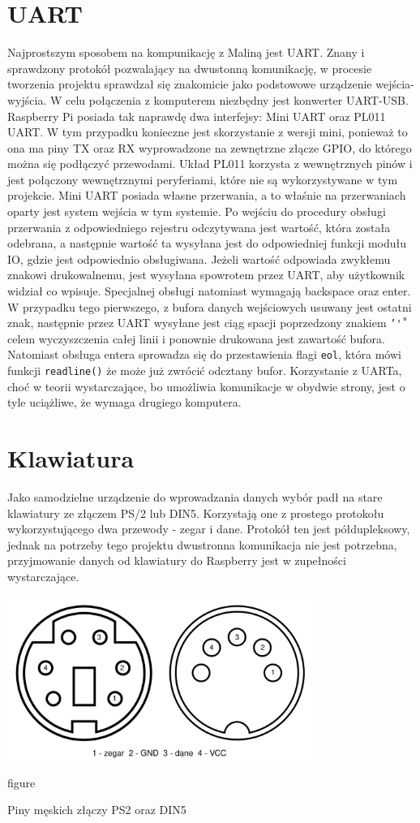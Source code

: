 \documentclass[shortabstract]{iithesis}
\begin{document}
\section{UART}
Najprostszym sposobem na kompunikację z Maliną jest UART. Znany i sprawdzony protokół pozwalający na dwustonną komunikację, w procesie tworzenia projektu sprawdzał się znakomicie jako podstowowe urządzenie wejścia-wyjścia. W celu połączenia z komputerem niezbędny jest konwerter UART-USB.
Raspberry Pi posiada tak naprawdę dwa interfejsy: Mini UART oraz PL011 UART. W tym przypadku konieczne jest skorzystanie z wersji mini, ponieważ to ona ma piny TX oraz RX wyprowadzone na zewnętrzne złącze GPIO, do którego można się podłączyć przewodami. Układ PL011 korzysta z wewnętrznych pinów i jest połączony wewnętrznymi peryferiami, które nie są wykorzystywane w tym projekcie.
Mini UART posiada własne przerwania, a to właśnie na przerwaniach oparty jest system wejścia w tym systemie. Po wejściu do procedury obsługi przerwania z odpowiedniego rejestru odczytywana jest wartość, która została odebrana, a następnie wartość ta wysyłana jest do odpowiedniej funkcji modułu IO, gdzie jest odpowiednio obsługiwana. Jeżeli wartość odpowiada zwykłemu znakowi drukowalnemu, jest wysyłana spowrotem przez UART, aby użytkownik widział co wpisuje. Specjalnej obsługi natomiast wymagają backspace oraz enter. W przypadku tego pierwszego, z bufora danych wejściowych usuwany jest ostatni znak, następnie przez UART wysyłane jest ciąg spacji poprzedzony znakiem \texttt{'\r'} celem wyczyszczenia całej linii i ponownie drukowana jest zawartość bufora. Natomiast obsługa entera sprowadza się do przestawienia flagi \texttt{eol}, która mówi funkcji \texttt{readline()} że może już zwrócić odcztany bufor.
 Korzystanie z UARTa, choć w teorii wystarczające, bo umożliwia komunikacje w obydwie strony, jest o tyle uciążliwe, że wymaga drugiego komputera.

\section{Klawiatura}
Jako samodzielne urządzenie do wprowadzania danych wybór padł na stare klawiatury ze złączem PS/2 lub DIN5. Korzystają one z prostego protokołu wykorzystującego dwa przewody - zegar i dane. Protokół ten jest półdupleksowy, jednak na potrzeby tego projektu dwustronna komunikacja nie jest potrzebna, przyjmowanie danych od klawiatury do Raspberry jest w zupełności wystarczające.

\begingroup
\centering
\includegraphics[width=0.75\textwidth]{pinout.png}
\captionsetup{type=figure}
\caption{figure}{Piny męskich złączy PS2 oraz DIN5}
\endgroup
\end{document}
